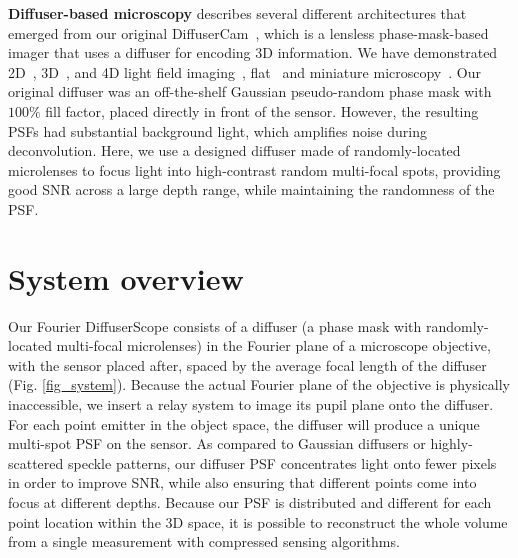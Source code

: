 \documentclass{osa-article}
\begin{document}
\textbf{Diffuser-based microscopy} describes several different architectures that emerged from our original DiffuserCam~\cite{antipa2018diffusercam}, which is a lensless phase-mask-based imager that uses a diffuser for encoding 3D information. We have demonstrated 2D~\cite{kuo2018flat,monakhova2019learned}, 3D~\cite{antipa2018diffusercam,liu2019diffuser,yanny2019randoscope,kuo2020flatscope }, and 4D light field imaging~\cite{antipa2016diffuserLF}, flat~\cite{kuo2020flatscope} and miniature microscopy~\cite{yanny2019randoscope}. Our original diffuser was an off-the-shelf Gaussian pseudo-random phase mask with $100 \%$ fill factor, placed directly in front of the sensor. However, the resulting PSFs had substantial background light, which amplifies noise during deconvolution. Here, we use a designed diffuser made of randomly-located microlenses to focus light into high-contrast random multi-focal spots, providing good SNR across a large depth range, while maintaining the randomness of the PSF.




\section{System overview}
\label{section_overview}
Our Fourier DiffuserScope consists of a diffuser (a phase mask with randomly-located multi-focal microlenses) in the Fourier plane of a microscope objective, with the sensor placed after, spaced by the average focal length of the diffuser (Fig. \ref{fig_system}). Because the actual Fourier plane of the objective is physically inaccessible, we insert a relay system to image its pupil plane onto the diffuser. For each point emitter in the object space, the diffuser will produce a unique multi-spot PSF on the sensor. As compared to Gaussian diffusers or highly-scattered speckle patterns, our diffuser PSF concentrates light onto fewer pixels in order to improve SNR, while also ensuring that different points come into focus at different depths. Because our PSF is distributed and different for each point location within the 3D space, it is possible to reconstruct the whole volume from a single measurement with compressed sensing algorithms. 
\end{document}

